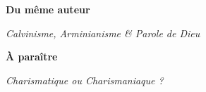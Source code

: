 \newpage
\mbox{}
\vfill
{\small
\begin{center}
{\bfseries Du même auteur}

\textit{Calvinisme, Arminianisme \& Parole de Dieu}

\end{center}
\begin{center}
{\bfseries À paraître}

\textit{Charismatique ou Charismaniaque ?}

\end{center}
}
\vfill
\mbox{}
\vfill
\mbox{}
\thispagestyle{empty}

